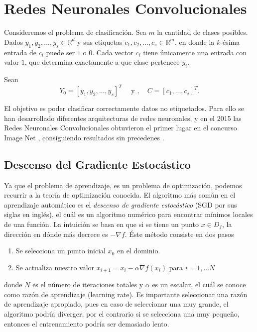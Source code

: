 \section{Redes Neuronales Convolucionales}
\label{section_cnn}
Consideremos el problema de clasificación. Sea $m$ la cantidad de clases posibles. Dados $y_1, y_2, ..., y_s \in \mathbb R^d$ y sus etiquetas $c_1, c_2, ..., c_s\in \mathbb R^m$, en donde la $k$-ésima entrada de $c_i$ puede ser $1$ o $0$. Cada vector $c_i$ tiene únicamente una entrada con valor $1$, que determina exactamente a que clase pertenece $y_i$.

    Sean 
    \begin{equation}
        \label{clasification}
        Y_0 = [y_1, y_2, ..., y_s]^T \quad \text{ y }, \quad  C = [c_1, ..., c_s]^T.
    \end{equation}

    El objetivo es poder clasificar correctamente datos no etiquetados. Para ello se han desarrollado diferentes arquitecturas de redes neuronales, y en el 2015 las Redes Neuronales Convolucionales obtuvieron el primer lugar en el concurso Image Net \cite{imageNet_dataset}, consiguiendo resultados sin precedenes \cite{resnet0}. 


\subsection{Descenso del Gradiente Estocástico}
Ya que el problema de aprendizaje, es un problema de optimización, podemos recurrir a la teoría de optimización conocida. El algoritmo más común en el aprendizaje automático es el \textsl{descenso de gradiente estocástico} (SGD por sus siglas en inglés), el cuál es un algoritmo numérico para encontrar mínimos locales de una función. La intuición se basa en que si se tiene un punto $x\in D_f$, la dirección en dónde más decrece es $-\nabla f$. Éste método consiste en dos pasos
\begin{enumerate}
    \item Se selecciona un punto inicial $x_0$ en el dominio.
    \item Se actualiza nuestro valor $x_{i+1} = x_i - \alpha\nabla f(x_i)$ para $i = 1, ... N$
\end{enumerate}
donde $N$ es el número de iteraciones totales y $\alpha$ es un escalar, el cuál se conoce como razón de aprendizaje (learning rate). Es importante seleccionar una razón de aprendizaje apropiado, pues en caso de seleccionar una muy grande, el algoritmo podría diverger, por el contrario si se selecciona una muy pequeño, entonces el entrenamiento podría ser demasiado lento. 

